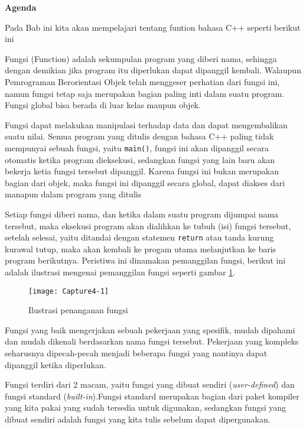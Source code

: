 \textbf{Agenda}

Pada Bab ini kita akan mempelajari tentang funtion bahasa C++ seperti berikut ini

\minitoc

Fungsi (Function) adalah sekumpulan program yang diberi nama, sehingga
dengan demikian jika program itu diperlukan dapat dipanggil kembali.
Walaupun Pemrograman Berorientasi Objek telah menggeser perhatian dari
fungsi ini, namun fungsi tetap saja merupakan bagian paling inti dalam
suatu program. Fungsi global bisa berada di luar kelas maupun objek.

Fungsi dapat melakukan manipulasi terhadap data dan dapat mengembalikan
suatu nilai. Semua program yang ditulis dengan bahasa C++ paling tidak
mempunyai sebuah fungsi, yaitu \texttt{main()}, fungsi ini akan
dipanggil secara otomatis ketika program dieksekusi, sedangkan fungsi
yang lain baru akan bekerja ketia fungsi tersebut dipanggil. Karena
fungsi ini bukan merupakan bagian dari objek, maka fungsi ini dipanggil
secara global, dapat diakses dari manapun dalam program yang ditulis

Setiap fungsi diberi nama, dan ketika dalam suatu program dijumpai nama
tersebut, maka eksekusi program akan dialihkan ke tubuh (isi) fungsi
tersebut, setelah selesai, yaitu ditandai dengan statemen
\texttt{return} atau tanda kurung kurawal tutup, maka akan kembali ke
progam utama melanjutkan ke baris program berikutnya. Peristiwa ini
dinamakan pemanggilan fungsi, berikut ini adalah ilustrasi mengenai
pemanggilan fungsi seperti gambar \ref{gambar4-1}.

\begin{figure}[htbp]
\centering
\texttt{[image: Capture4-1]}
\label{gambar4-1}
\caption{Ilustrasi penanganan fungsi}
\end{figure}

Fungsi yang baik mengerjakan sebuah pekerjaan yang spesifik, mudah
dipahami dan mudah dikenali berdasarkan nama fungsi tersebut. Pekerjaan
yang kompleks seharusnya dipecah-pecah menjadi beberapa fungsi yang
nantinya dapat dipanggil ketika diperlukan.

Fungsi terdiri dari 2 macam, yaitu fungsi yang dibuat sendiri
(\emph{user-defined}) dan fungsi standard (\emph{built-in}).Fungsi
standard merupakan bagian dari paket kompiler yang kita pakai yang sudah
tersedia untuk digunakan, sedangkan fungsi yang dibuat sendiri adalah
fungsi yang kita tulis sebelum dapat dipergunakan.

